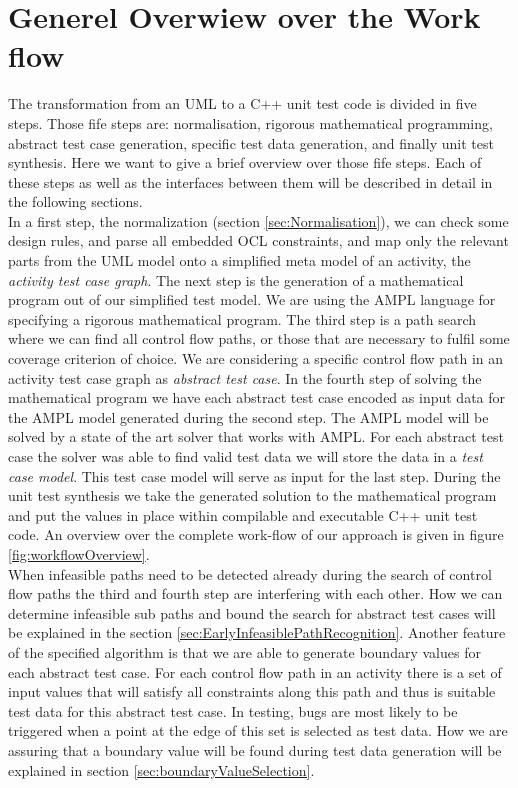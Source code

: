 \section{Generel Overwiew over the Work flow} %
\label{sec:testgenerationOverview}
The transformation from an UML  to a C++ unit test code is divided in five steps. Those fife steps are: normalisation, rigorous mathematical programming, abstract test case generation, specific test data generation, and finally unit test synthesis. Here we want to give a brief overview over those fife steps. Each of these steps as well as the interfaces between them will be described in detail in the following sections.\\
In a first step, the normalization (section \ref{sec:Normalisation}), we can check some design rules, and parse all embedded OCL constraints, and map only the relevant parts from the UML model onto a simplified meta model of an activity, the \emph{activity test case graph}. The next step is the generation of a mathematical program out of our simplified test model. We are using the AMPL language for specifying a rigorous mathematical program. The third step is a path search where we can find all control flow paths, or those that are necessary to fulfil some coverage criterion of choice. We are considering a specific control flow path in an activity test case graph as \emph{abstract test case}. In the fourth step of solving the mathematical program we have each abstract test case encoded as input data for the AMPL model generated during the second step. The AMPL model will be solved by a state of the art solver that works with AMPL. For each abstract test case the solver was able to find valid test data we will store the data in a \emph{test case model}. This test case model will serve as input for the last step. During the unit test synthesis we take the generated solution to the mathematical program and put the values in place within compilable and executable C++ unit test code. An overview over the complete work-flow of our approach is given in figure \ref{fig:workflowOverview}.\\
When infeasible paths need to be detected already during the search of control flow paths the third and fourth step are interfering with each other. How we can determine infeasible sub paths and bound the search for abstract test cases will be explained in the section \ref{sec:EarlyInfeasiblePathRecognition}. Another  feature of the specified algorithm is that we are able to generate boundary values for each abstract test case. For each control flow path in an activity there is a set of input values that will satisfy all constraints along this path and thus is suitable test data for this abstract test case. In testing, bugs are most likely to be triggered when a point at the edge of this set is selected as test data. How we are assuring that a boundary value will be found during test data generation will be explained in section \ref{sec:boundaryValueSelection}.
